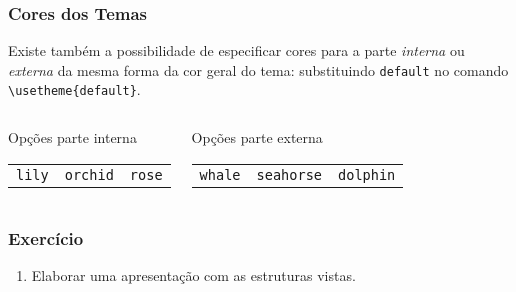 \begin{frame}[fragile]
\frametitle{Cores dos Temas}
Existe também a possibilidade de especificar cores para a parte \textit{interna} ou
\textit{externa} da mesma forma da cor geral do tema: substituindo \texttt{default} no comando
\verb|\usetheme{default}|.


\begin{columns}[t]
       \begin{block}{Opções parte interna}
          \centering
\begin{tabular}{ccc}
\small
\texttt{lily} & \texttt{orchid} & \texttt{rose} \\
\end{tabular}
       \end{block}
       \begin{block}{Opções parte externa}
                    \centering
\begin{tabular}{ccc}
\small
\texttt{whale} & \texttt{seahorse} & \texttt{dolphin} \\
\end{tabular}
       \end{block}
\end{columns}

\end{frame}


\begin{frame}
\frametitle{Exercício}

\begin{enumerate}
  \item Elaborar uma apresentação com as estruturas vistas.
\end{enumerate}
 
\end{frame}

